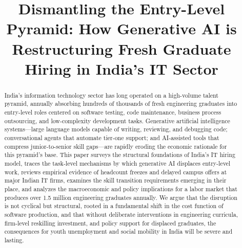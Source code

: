 \documentclass[conference]{IEEEtran}
\begin{document}
\title{Dismantling the Entry-Level Pyramid: How Generative AI is\\Restructuring Fresh Graduate Hiring in India's IT Sector}

\author{
\and
{}
}

\maketitle

\begin{abstract}
India's information technology sector has long operated on a high-volume talent pyramid, annually absorbing hundreds of thousands of fresh engineering graduates into entry-level roles centered on software testing, code maintenance, business process outsourcing, and low-complexity development tasks. Generative artificial intelligence systems---large language models capable of writing, reviewing, and debugging code; conversational agents that automate tier-one support; and AI-assisted tools that compress junior-to-senior skill gaps---are rapidly eroding the economic rationale for this pyramid's base. This paper surveys the structural foundations of India's IT hiring model, traces the task-level mechanisms by which generative AI displaces entry-level work, reviews empirical evidence of headcount freezes and delayed campus offers at major Indian IT firms, examines the skill transition requirements emerging in their place, and analyzes the macroeconomic and policy implications for a labor market that produces over 1.5 million engineering graduates annually. We argue that the disruption is not cyclical but structural, rooted in a fundamental shift in the cost function of software production, and that without deliberate interventions in engineering curricula, firm-level reskilling investment, and policy support for displaced graduates, the consequences for youth unemployment and social mobility in India will be severe and lasting.
\end{abstract}
\end{document}
